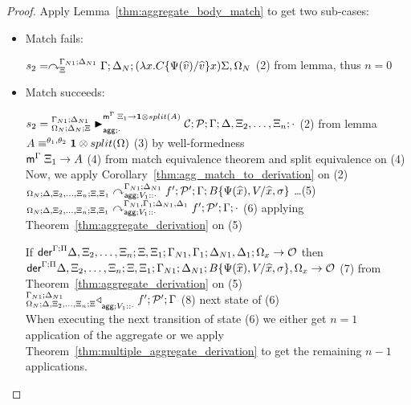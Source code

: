 \begin{proof}
Apply Lemma~\ref{thm:aggregate_body_match} to get two sub-cases:
   
\begin{itemize}[leftmargin=*]
   \item Match fails:
   
   $s_2 = \derstatex{\Gamma}{\Delta_N}{\Xi}{\Gamma_{N1}}{\Delta_{N1}}
{(\lambda x.  C\{\Psi(\widehat{v})/\widehat{v}\} x) \Sigma,
   \Omega_N}$ \hfill (2) from lemma, thus $n = 0$\\
   
   \item Match succeeds:


      $s_2 = \matstatea{\Delta_N}{\lstack{C}; \lstack{P}}{\Gamma}
         {\Delta, \Xi_2, \dotsc, \Xi_n}{\cdot}{\Xi_1 \rightarrow \one \otimes
                                                 split(A)}{\cdot}$ \hfill (2) from
                                lemma \\
      $\feq{A}{\one \otimes split(\Omega)}$ \hfill (3) by well-formedness \\
      $\mz{\Gamma}{\Xi_1}{A}$ \hfill (4) from match equivalence
      theorem and split equivalence on (4) \\

      Now, we apply Corollary~\ref{thm:agg_match_to_derivation} on (2) \\

      $\derstatea{\Delta, \Xi_2, \dotsc, \Xi_n}{\Xi,
         \Xi_1}{\Gamma_{N1}}{\Delta_{N1}}{V_1 :: \cdot}{f';
            \lstack{P'}}{B\{\Psi(\widehat{x}), V / \widehat{x}, \sigma\}}$
      \dots \hfill (5) \\

      $\derstatea{\Delta, \Xi_2, \dotsc, \Xi_n}{\Xi, \Xi_1}{\Gamma_{N1},
         \Gamma_1}{\Delta_{N1}, \Delta_1}{V_1 :: \cdot}{f'; \lstack{P'}}{\cdot}$
      \hfill (6) applying Theorem~\ref{thm:aggregate_derivation} on (5)

      If $\dz{\Gamma}{\Pi}{\Delta, \Xi_2, \dotsc, \Xi_n}{\Xi, \Xi_1}{\Gamma_{N1},
         \Gamma_1}{\Delta_{N1}, \Delta_1}{\Omega_x}{\outsem}$ then \\
         \hspace{2cm}
         $\dz{\Gamma}{\Pi}{\Delta, \Xi_2, \dotsc,
            \Xi_n}{\Xi, \Xi_1}{\Gamma_{N1}}{\Delta_{N1}}{B\{\Psi(\widehat{x}), V
               / \widehat{x}, \sigma\}, \Omega_x}{\outsem}$
            \hfill (7) from
      Theorem~\ref{thm:aggregate_derivation} on (5) \\


      $\contstatea{\Delta, \Xi_2, \dotsc, \Xi_n}{f' ; \lstack{P'}}{\Gamma}{V_1
         :: \cdot}$ \hfill (8) next state of (6) \\

   
   When executing the next transition of state (6) we either get $n = 1$
   application of the aggregate or we apply
   Theorem~\ref{thm:multiple_aggregate_derivation} to get the remaining $n-1$
   applications.
\end{itemize}
\end{proof}
